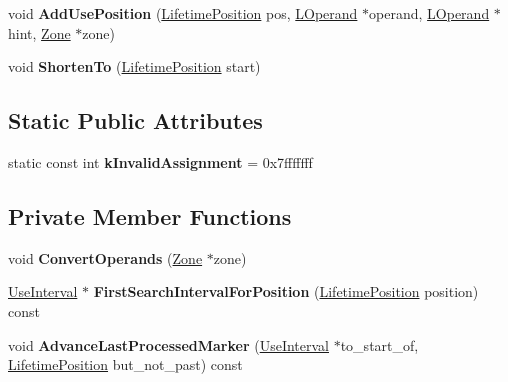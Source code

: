 \begin{DoxyCompactItemize}
\item 
void {\bfseries Add\+Use\+Position} (\hyperlink{classv8_1_1internal_1_1_lifetime_position}{Lifetime\+Position} pos, \hyperlink{classv8_1_1internal_1_1_l_operand}{L\+Operand} $\ast$operand, \hyperlink{classv8_1_1internal_1_1_l_operand}{L\+Operand} $\ast$hint, \hyperlink{classv8_1_1internal_1_1_zone}{Zone} $\ast$zone)\hypertarget{classv8_1_1internal_1_1_live_range_aff7ace7f236d62b16dca0741aa0be868}{}\label{classv8_1_1internal_1_1_live_range_aff7ace7f236d62b16dca0741aa0be868}

\item 
void {\bfseries Shorten\+To} (\hyperlink{classv8_1_1internal_1_1_lifetime_position}{Lifetime\+Position} start)\hypertarget{classv8_1_1internal_1_1_live_range_a16d6deef300ff836d863a53f91350568}{}\label{classv8_1_1internal_1_1_live_range_a16d6deef300ff836d863a53f91350568}

\end{DoxyCompactItemize}
\subsection*{Static Public Attributes}
\begin{DoxyCompactItemize}
\item 
static const int {\bfseries k\+Invalid\+Assignment} = 0x7fffffff\hypertarget{classv8_1_1internal_1_1_live_range_a4885d99de0dd32127dd111b64a284891}{}\label{classv8_1_1internal_1_1_live_range_a4885d99de0dd32127dd111b64a284891}

\end{DoxyCompactItemize}
\subsection*{Private Member Functions}
\begin{DoxyCompactItemize}
\item 
void {\bfseries Convert\+Operands} (\hyperlink{classv8_1_1internal_1_1_zone}{Zone} $\ast$zone)\hypertarget{classv8_1_1internal_1_1_live_range_aaddb77b0f38f390a0d8b13d8d48f0a13}{}\label{classv8_1_1internal_1_1_live_range_aaddb77b0f38f390a0d8b13d8d48f0a13}

\item 
\hyperlink{classv8_1_1internal_1_1_use_interval}{Use\+Interval} $\ast$ {\bfseries First\+Search\+Interval\+For\+Position} (\hyperlink{classv8_1_1internal_1_1_lifetime_position}{Lifetime\+Position} position) const \hypertarget{classv8_1_1internal_1_1_live_range_a3278abec3dc856869e105db581b6a814}{}\label{classv8_1_1internal_1_1_live_range_a3278abec3dc856869e105db581b6a814}

\item 
void {\bfseries Advance\+Last\+Processed\+Marker} (\hyperlink{classv8_1_1internal_1_1_use_interval}{Use\+Interval} $\ast$to\+\_\+start\+\_\+of, \hyperlink{classv8_1_1internal_1_1_lifetime_position}{Lifetime\+Position} but\+\_\+not\+\_\+past) const \hypertarget{classv8_1_1internal_1_1_live_range_a2c0223c4323d528acde370b5e5922ec1}{}\label{classv8_1_1internal_1_1_live_range_a2c0223c4323d528acde370b5e5922ec1}

\end{DoxyCompactItemize}
